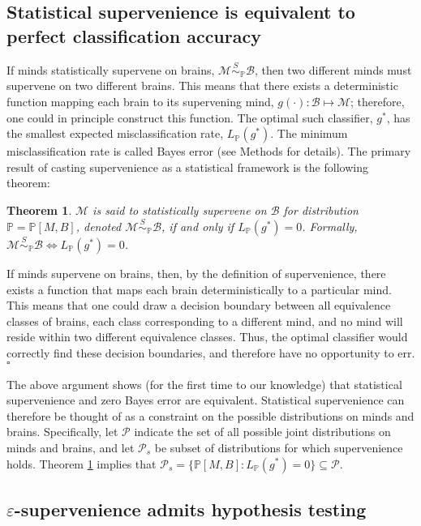\documentclass{article}
\newcommand{\mB}{\mathcal{B}}
\newcommand{\mM}{\mathcal{M}}
\newcommand{\PP}{\mathbb{P}}           %
\newcommand{\eps}{\varepsilon}
\providecommand{\mc}[1]{\mathcal{#1}}
\newcommand{\MsB}{\mM \overset{S}{\sim}_{\PP} \mB}
\newtheorem{thm}{Theorem}
\begin{document}
\subsection*{Statistical supervenience is equivalent to perfect classification accuracy} %
\label{sub:theoretical_results}

If minds statistically supervene on brains, $\MsB$, then two different minds must supervene on two different brains.  This means that there exists a deterministic function mapping each brain to its supervening mind, $g(\cdot): \mB \mapsto \mM$; therefore, one could in principle construct this function. The optimal such classifier, $g^*$, has the smallest expected misclassification rate, $L_{\PP}(g^*)$.  The minimum misclassification rate is called Bayes error (see Methods for details). 
The primary result of casting supervenience as a statistical framework is the following theorem: 
\begin{thm}
\label{thm1} 
$\mM$ is said to \textit{statistically supervene} on $\mB$ for distribution $\PP=\PP[M,B]$, denoted $\mM \overset{S}{\sim}_{\PP} \mB$, if and only if $L_{\PP}(g^*) = 0$. Formally, \mbox{$\MsB \Leftrightarrow L_{\PP}(g^*)=0$}.  
\end{thm}

\noindent If minds supervene on brains, then, by the definition of supervenience, there exists a function that maps each brain deterministically to a particular mind.  This means that one could draw a decision boundary between all equivalence classes of brains, each class corresponding to a different mind, and no mind will reside within two different equivalence classes.  Thus, the optimal classifier would correctly find these decision boundaries, and therefore have no opportunity to err. $\square$

The above argument shows (for the first time to our knowledge) that statistical supervenience and zero Bayes error are equivalent. Statistical supervenience can therefore be thought of as a constraint on the possible distributions on minds and brains.  Specifically, let $\mc{P}$ indicate the set of all possible joint distributions on minds and brains, and let $\mc{P}_s$ be subset of distributions for which supervenience holds. Theorem \ref{thm1} implies that $\mc{P}_s = \{\PP[M,B] : L_{\PP}(g^*)=0\} \subseteq \mc{P}$.


\subsection*{$\eps$-supervenience admits hypothesis testing} %
\label{sub:hypothesis_testing}
\end{document}
